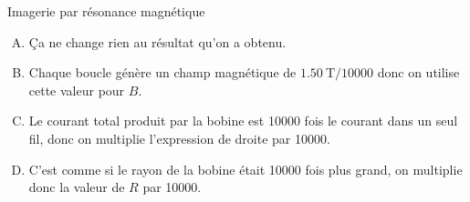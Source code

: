 \documentclass{beamer}
\begin{document}
\begin{frame}[t]{Imagerie par résonance magnétique}
{    \begin{enumerate}[A.]
      \item Ça ne change rien au résultat qu'on a obtenu.
      \item<alert@12> Chaque boucle génère un champ magnétique de
        $\SI{1.50}{\tesla}/\num{10000}$
        donc on utilise cette valeur pour $B$.
      \item<alert@12> Le courant total produit par la bobine est \num{10000} fois le
        courant dans un seul fil, donc on multiplie l'expression de droite par
        \num{10000}.
      \item C'est comme si le rayon de la bobine était \num{10000} fois plus
        grand, on multiplie donc la valeur de $R$ par \num{10000}.
    \end{enumerate}
  }

\end{frame}
\end{document}
